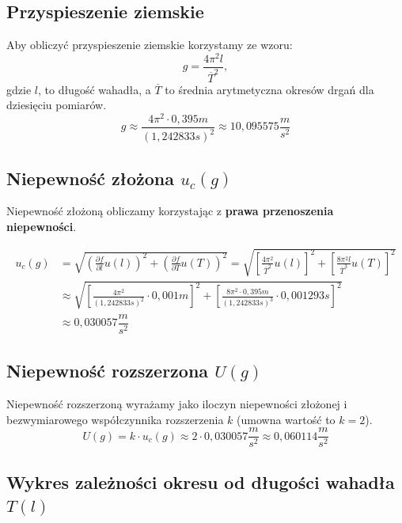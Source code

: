 \documentclass[a4paper,11pt]{article}
\begin{document}
\subsection{Przyspieszenie ziemskie}
Aby obliczyć przyspieszenie ziemskie korzystamy ze wzoru:
$$g=\frac{4\pi^{2}l}{\overline{T}^{2}},$$
gdzie $l$, to długość wahadła, a $\overline{T}$ to średnia arytmetyczna okresów drgań dla dziesięciu pomiarów.
$$g\approx\frac{4\pi^{2}\cdot0,395m}{(1,242833s)^{2}}\approx10,095575\dfrac{m}{s^{2}}$$

\subsection{Niepewność złożona $u_{c}(g)$}
Niepewność złożoną obliczamy korzystając z \textbf{prawa przenoszenia niepewności}.
\begin{center}
\begin{align*}
u_{c}(g)&=\sqrt{\left(\frac{\partial f}{\partial l}u(l)\right)^{2}+\left(\frac{\partial f}{\partial T}u(T)\right)^{2}}=\sqrt{\left[\frac{4\pi^{2}}{\overline{T}^{2}}u(l)\right]^{2}+\left[\frac{8\pi^{2}l}{\overline{T}^{3}}u(T)\right]^{2}}\\
&\approx\sqrt{\left[\frac{4\pi^{2}}{(1,242833s)^{2}}\cdot0,001m\right]^{2}+\left[\frac{8\pi^{2}\cdot0,395m}{(1,242833s)^{3}}\cdot0,001293s\right]^{2}}\\
&\approx0,030057\dfrac{m}{s^{2}}
\end{align*}
\end{center}

\subsection{Niepewność rozszerzona $U(g)$}

Niepewność rozszerzoną wyrażamy jako iloczyn niepewności złożonej i bezwymiarowego współczynnika rozszerzenia $k$ (umowna wartość to $k=2$).
$$
U(g)=k \cdot u_{c}(g)\approx 2 \cdot0,030057\frac{m}{s^{2}}\approx0,060114\frac{m}{s^{2}}
$$
\subsection{Wykres zależności okresu od długości wahadła $T(l)$}

\begin{center}
\end{center}
\end{document}
